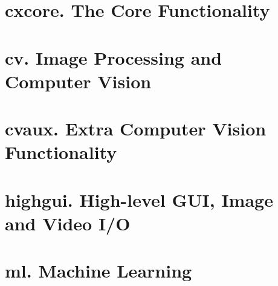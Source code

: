 

\chapter{cxcore. The Core Functionality}








\chapter{cv. Image Processing and Computer Vision}











\chapter{cvaux. Extra Computer Vision Functionality}




\chapter{highgui. High-level GUI, Image and Video I/O}


\chapter{ml. Machine Learning}

